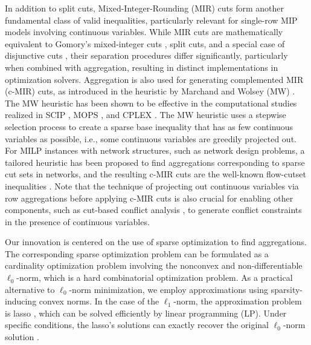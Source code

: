 \documentclass[a4paper,UKenglish,cleveref, autoref,  thm-restate]{lipics-v2021}
\def\ie{{i.e.,} }
\begin{document}
	
	In addition to split cuts, Mixed-Integer-Rounding (MIR) cuts \cite{nemhauser1990recursive} form another fundamental class of valid inequalities, particularly relevant for single-row MIP models involving continuous variables. While MIR cuts are mathematically equivalent to Gomory’s mixed-integer cuts \cite{gomory1960algorithm}, split cuts, and a special case of disjunctive cuts \cite{balas1979disjunctive}, their separation procedures differ significantly, particularly when combined with aggregation, resulting in distinct implementations in optimization solvers.
	Aggregation is also used for generating complemented MIR (c-MIR) cuts, as introduced in the heuristic by Marchand and Wolsey (MW) \cite{marchand19990,marchand2001aggregation}. The MW heuristic has been shown to be effective in the computational studies realized in SCIP \cite{achterberg2007constraint,wolter2006implementation}, MOPS \cite{christophel2009separation}, and CPLEX \cite{gonccalves2005implementation}.
	The MW heuristic uses a stepwise selection process to create a sparse base inequality that has as few continuous variables as possible, \ie some continuous variables are greedily projected out. %
	For MILP instances with network structures, such as network design problems, a tailored heuristic \cite{achterberg2010mcf} has been proposed to find aggregations corresponding to sparse cut sets in networks, and the resulting c-MIR cuts are the well-known flow-cutset inequalities \cite{atamturk2002capacitated,bienstock1996capacitated}.
	Note that the technique of projecting out continuous variables via row aggregations before applying c-MIR cuts is also crucial for enabling other components, such as cut-based conflict analysis \cite{mexi2024cut}, to generate conflict constraints in the presence of continuous variables.
	
	
	
	
	Our innovation is centered on the use of sparse optimization to find aggregations.  The corresponding sparse optimization problem can be formulated as a cardinality optimization problem \cite{tillmann2024cardinality} involving the nonconvex and non-differentiable $\ell_0$-norm, which is a hard combinatorial optimization problem. As a practical alternative to $\ell_0$-norm minimization, we employ approximations using sparsity-inducing convex norms. In the case of the $\ell_1$-norm,  the approximation problem is lasso \cite{tibshirani1996regression}, which can be solved efficiently by linear programming (LP). Under specific conditions, the lasso's solutions can exactly recover the original $\ell_0$-norm solution \cite{candes2006robust,chen2001atomic}.
	
\end{document}
